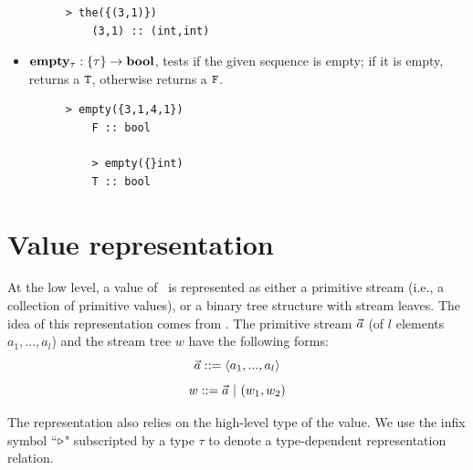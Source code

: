 \begin{itemize}
\begin{figure}[H]
\begin{lstlisting}[style = nesl-style]
	> the({(3,1)})
	(3,1) :: (int,int)
	\end{lstlisting}
	\end{figure}
	
	\item $\mathbf{empty_{\tau}:  \{\tau\} \rightarrow \mathbf{bool}}$, tests if the given sequence is empty; if it is empty, returns a $\mathtt{T}$, otherwise returns a $\mathtt{F}$.
	\begin{figure}[H]
	\begin{example}
	\end{example}
	\begin{lstlisting}[style = nesl-style]
	> empty({3,1,4,1})
	F :: bool
	
	> empty({}int)
	T :: bool
	\end{lstlisting}
	\end{figure}
\end{itemize}



\section{Value representation} \label{sec:valrep}
At the low level, a value of \mysnesl \ is represented as either a primitive stream (i.e., a collection of primitive values),
or a binary tree structure with stream leaves. 
The idea of this representation comes from \cite{Blel90vecmod}. 
The primitive stream $\vec a$ (of $l$ elements $a_1,...,a_l$) and the stream tree $w$ have the following forms: 
$$ \a ::= \<a_1,...,a_l\'>$$
$$ w ::= \a \ | \ (w_1,w_2) $$

The representation also relies on the high-level type of the value. 
We use the infix symbol ``$ \triangleright$" subscripted by a type $\tau$ to denote a type-dependent representation relation.


